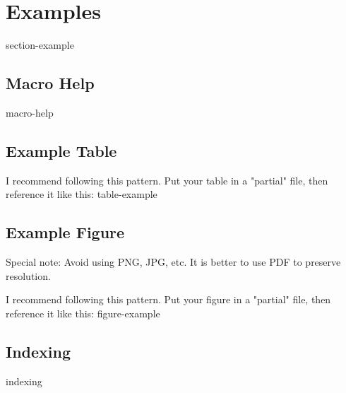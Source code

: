 \chapter{Examples}

{section-example}

\section{Macro Help}
{macro-help}


\section{Example Table}
I recommend following this pattern. Put your table in a "partial" file, then reference it like this:
{table-example}


\section{Example Figure}
Special note: Avoid using PNG, JPG, etc. It is better to use PDF to preserve resolution.

I recommend following this pattern. Put your figure in a "partial" file, then reference it like this:
{figure-example}


\section{Indexing}
{indexing}


